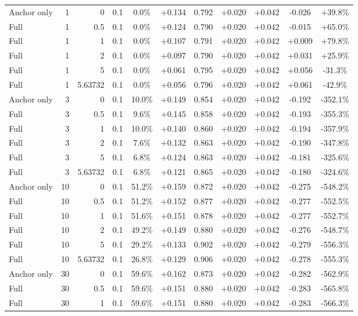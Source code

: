\begin{table}[htbp]
\begin{tabular}{lrrrccccccc}
Anchor only & 1 & 0 & 0.1 & 0.0\% & +0.134 & 0.792 & +0.020 & +0.042 & -0.026 & +39.8\% \\
Full & 1 & 0.5 & 0.1 & 0.0\% & +0.124 & 0.790 & +0.020 & +0.042 & -0.015 & +65.0\% \\
Full & 1 & 1 & 0.1 & 0.0\% & +0.107 & 0.791 & +0.020 & +0.042 & +0.009 & +79.8\% \\
Full & 1 & 2 & 0.1 & 0.0\% & +0.097 & 0.790 & +0.020 & +0.042 & +0.031 & +25.9\% \\
Full & 1 & 5 & 0.1 & 0.0\% & +0.061 & 0.795 & +0.020 & +0.042 & +0.056 & -31.3\% \\
Full & 1 & 5.63732 & 0.1 & 0.0\% & +0.056 & 0.796 & +0.020 & +0.042 & +0.061 & -42.9\% \\
Anchor only & 3 & 0 & 0.1 & 10.0\% & +0.149 & 0.854 & +0.020 & +0.042 & -0.192 & -352.1\% \\
Full & 3 & 0.5 & 0.1 & 9.6\% & +0.145 & 0.858 & +0.020 & +0.042 & -0.193 & -355.3\% \\
Full & 3 & 1 & 0.1 & 10.0\% & +0.140 & 0.860 & +0.020 & +0.042 & -0.194 & -357.9\% \\
Full & 3 & 2 & 0.1 & 7.6\% & +0.132 & 0.863 & +0.020 & +0.042 & -0.190 & -347.8\% \\
Full & 3 & 5 & 0.1 & 6.8\% & +0.124 & 0.863 & +0.020 & +0.042 & -0.181 & -325.6\% \\
Full & 3 & 5.63732 & 0.1 & 6.8\% & +0.121 & 0.865 & +0.020 & +0.042 & -0.180 & -324.6\% \\
Anchor only & 10 & 0 & 0.1 & 51.2\% & +0.159 & 0.872 & +0.020 & +0.042 & -0.275 & -548.2\% \\
Full & 10 & 0.5 & 0.1 & 51.2\% & +0.152 & 0.877 & +0.020 & +0.042 & -0.277 & -552.5\% \\
Full & 10 & 1 & 0.1 & 51.6\% & +0.151 & 0.878 & +0.020 & +0.042 & -0.277 & -552.7\% \\
Full & 10 & 2 & 0.1 & 49.2\% & +0.149 & 0.880 & +0.020 & +0.042 & -0.276 & -548.7\% \\
Full & 10 & 5 & 0.1 & 29.2\% & +0.133 & 0.902 & +0.020 & +0.042 & -0.279 & -556.3\% \\
Full & 10 & 5.63732 & 0.1 & 26.8\% & +0.129 & 0.906 & +0.020 & +0.042 & -0.278 & -555.3\% \\
Anchor only & 30 & 0 & 0.1 & 59.6\% & +0.162 & 0.873 & +0.020 & +0.042 & -0.282 & -562.9\% \\
Full & 30 & 0.5 & 0.1 & 59.6\% & +0.151 & 0.880 & +0.020 & +0.042 & -0.283 & -565.8\% \\
Full & 30 & 1 & 0.1 & 59.6\% & +0.151 & 0.880 & +0.020 & +0.042 & -0.283 & -566.3\% \\

\end{tabular}
\end{table}
